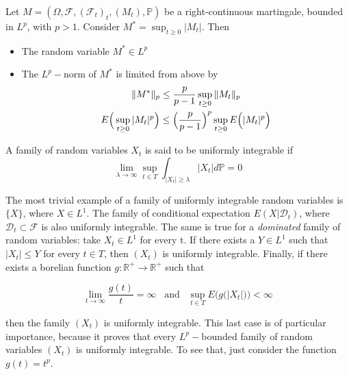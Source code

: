 \begin{theorem}
        Let $M = (\Omega, \mathcal{F}, (\mathcal{F}_t)_t, (M_t), \mathbb{P})$ be a right-continuous martingale, bounded in $L^p$, with $p > 1$. Consider $M^* = \sup_{t\geq 0} \vert M_t \vert$. Then 
        \begin{itemize}
            \item The random variable $M^* \in L^p$
            \item The $L^p-$norm of $M^*$ is limited from above by
            \begin{gather}
                \Vert M^* \Vert_p \leq \frac{p}{p-1} \sup_{t\geq 0} \Vert M_t \Vert_p \notag \\
                E\Big( \sup_{t \geq 0} \vert M_t \vert^p \Big) \leq \Big( \frac{p}{p-1} \Big)^p \sup_{t \geq 0} E\Big( \vert M_t \vert^p \Big)
            \end{gather}
        \end{itemize}
\end{theorem}

\begin{definition}
    A family of random variables $X_t$ is said to be uniformly integrable if 
    \begin{equation}
        \lim_{\lambda \to \infty} \sup_{t \in T} \int_{\vert X_t \vert \geq \lambda} \vert X_t \vert d\mathbb{P} = 0
    \end{equation}
\end{definition}

The most trivial example of a family of uniformly integrable random variables is $\{ X \}$, where $X \in L^1$. The family of conditional expectation $E(X \vert \mathcal{D}_t)$, where $\mathcal{D}_t \subset \mathcal{F}$ is also uniformly integrable. The same is true for a \textit{dominated} family of random variables: take $X_t \in L^1$ for every t. If there exists a $Y \in L^1$ such that $\vert X_t \vert \leq Y$ for every $t \in T$, then $(X_t)$ is uniformly integrable. Finally, if there exists a borelian function $g : \mathbb{R}^+ \to \mathbb{R}^+$ such that

\begin{equation*}
    \lim_{t \to \infty} \frac{g(t)}{t} = \infty \;\;\; \text{and} \;\;\; \sup_{t \in T} E\Big( g\big(\vert X_t \vert\big) \Big) < \infty
\end{equation*}

then the family $(X_t) $ is uniformly integrable. This last case is of particular importance, because it proves that every $L^p-$bounded family of random variables $(X_t)$ is uniformly integrable. To see that, just consider the function $g(t) = t^p$. 

